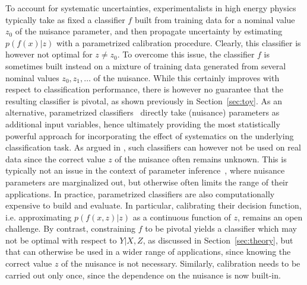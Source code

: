\documentclass[twocolumn,superscriptaddress,aps]{revtex4-1}
\theoremstyle{plain}
\begin{document}
To account for systematic uncertainties, experimentalists in high energy physics
typically take as fixed a classifier $f$ built from training data for a nominal
value $z_0$ of the nuisance parameter, and then propagate uncertainty
 by estimating $p(f(x)|z)$ with a parametrized calibration
procedure. Clearly, this classifier is however not optimal for $z \neq z_0$.
To overcome this issue, the classifier $f$ is sometimes built instead on a mixture
of training data generated from several nominal values $z_0, z_1, \dots$ of the nuisance.
While this certainly improves with respect to classification performance,
there is however no guarantee that the resulting classifier is pivotal, as shown
previously in Section~\ref{sec:toy}.
As an alternative, parametrized
classifiers~\citep{cranmer2015approximating,Baldi:2016fzo} directly take
(nuisance) parameters as additional input variables, hence ultimately providing
the most statistically powerful approach for incorporating the effect of
systematics on the underlying classification task.  As argued in
\citep{Neal:2007zz}, such classifiers can however not be used on real data since
the correct value $z$ of the nuisance often remains unknown. This is typically
not an issue in the context of parameter
inference~\citep{cranmer2015approximating}, where nuisance parameters are
marginalized out, but otherwise often limits the range of their applications. In
practice, parametrized classifiers  are also computationally expensive to build
and evaluate. In particular, calibrating their decision function, i.e.
approximating $p(f(x,z)|z)$ as a continuous function of $z$, remains an open
challenge. By contrast, constraining $f$ to be pivotal yields a classifier which
may not be optimal with respect to $Y|X,Z$, as discussed in
Section~\ref{sec:theory}, but that can otherwise be used in a wider range of
applications, since knowing the correct value $z$ of the nuisance is not
necessary. Similarly, calibration needs to be carried out only once, since  the
dependence on the nuisance is now built-in.
\end{document}
